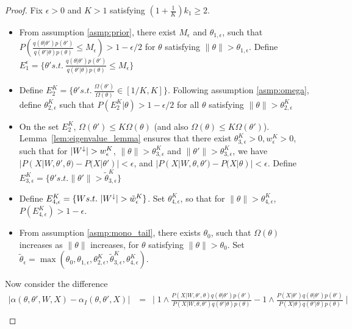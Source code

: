 \begin{proof}
  Fix $\epsilon > 0$ and $K > 1$ satisfying $(1 + \frac{1}{K})k_1 \ge 2$.
  \begin{itemize}
    \item  
From assumption \ref{asmp:prior}, there exist 
$M_\epsilon$ and $\theta_{1,\epsilon}$, such that 
$P(\frac{q(\theta | \theta')p(\theta')}{q(\theta' | \theta)p(\theta)}\leq M_\epsilon) > 1 - \epsilon / 2$ 
{for } $\theta$ satisfying $ \| \theta \| > \theta_{1,\epsilon}$.
    Define  $E_1^\epsilon = \{\theta' s.t.\ \frac{q(\theta | \theta')p(\theta')}{q(\theta' | \theta)p(\theta)}\leq M_\epsilon\}$
    \item Define $E^K_2 = \{\theta' s.t.\ \frac{\Omega(\theta')}{\Omega(\theta)}\in [1/K, K] \}$.
Following assumption \ref{asmp:omega}, define $\theta_{2, \epsilon}^K$ 
such that $P(E^K_2 | \theta) > 1 - \epsilon / 2$ for all $\theta$ satisfying $\| \theta \| > \theta_{2, \epsilon}^K$
    \item On the set $E^K_2$, $\Omega(\theta') \le K \Omega(\theta)$ (and also
$\Omega(\theta) \le K \Omega(\theta')$).  Lemma~\ref{lem:eigenvalue_lemma}
ensures that there exist $\theta_{3,\epsilon}^K > 0, w_\epsilon^K > 0$, 
such that for ${|W^\downarrow}| > w_\epsilon^K$, 
$ \| \theta \| > \theta_{3,\epsilon}^K$ and 
$ \| \theta' \| > \theta_{3,\epsilon}^K$, we have
$|P(X | W, \theta' , \theta) - P(X | \theta' )| < \epsilon$, and
$|P(X | W, \theta , \theta') - P(X | \theta )| < \epsilon$.
Define      $E_{3, \epsilon}^K = \{\theta' s.t. \| \theta'\| > \tilde{\theta}_{3,\epsilon}^K \}$ 
    \item Define $E_{4, \epsilon}^K =\{W s.t.\ \mW >  \tilde{w}_{\epsilon}^K\}$.
Set $\theta_{4,\epsilon}^K$, so that for $\| \theta \| > \theta_{4,\epsilon}^K$, 
$
P(E_{4,\epsilon}^K ) > 1 - \epsilon.
$
    \item From assumption \ref{asmp:mono_tail}, there exists $\theta_0$, such that $\Omega(\theta)$ increases as $\| \theta \|$ increases, for $\theta$ satisfying $\| \theta \| > \theta_0$.
Set $\tilde{\theta}_\epsilon =\max(\theta_0, \theta_{1, \epsilon},\theta_{2, \epsilon}^K,\tilde{\theta}_{3, \epsilon}^K, \theta_{4, \epsilon}^K)$. \\
  \end{itemize}
  Now consider the difference
\begin{align*}
|\alpha(\theta, \theta', W, X) - \alpha_I(\theta, \theta', X)| &= \ \mid 1 \wedge \frac{P(X | W, \theta' , \theta)q(\theta | \theta')p(\theta')}{P(X | W, \theta , \theta')q(\theta' | \theta)p(\theta)} - 1 \wedge \frac{P(X | \theta')q(\theta | \theta')p(\theta')}{P(X | \theta)q(\theta' | \theta)p(\theta)} \mid \\

\end{align*}
\end{proof}
